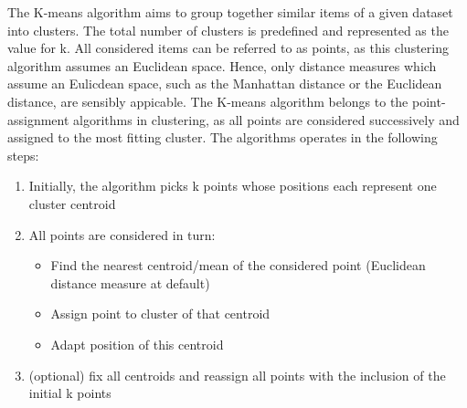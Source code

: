 The K-means algorithm aims to group together similar items of a given dataset into clusters. 
The total number of clusters is predefined and represented as the value for k. All considered items can be referred to as points, as this clustering algorithm assumes an Euclidean space. Hence, only distance measures which assume an Eulicdean space, such as the Manhattan distance or the Euclidean distance, are sensibly appicable. The K-means algorithm belongs to the point-assignment algorithms in clustering, as all points are considered successively and assigned to the most fitting cluster. The algorithms operates in the following steps: \cite{MMDS}
\begin{enumerate}
	\item Initially, the algorithm picks k points whose positions each represent one cluster centroid
	\item All points are considered in turn:
	\begin{itemize}
		\item Find the nearest centroid/mean of the considered point (Euclidean distance measure at default)
		\item Assign point to cluster of that centroid
		\item Adapt position of this centroid
	\end{itemize}	
	
	\item (optional) fix all centroids and reassign all points with the inclusion of the initial k points
	
\end{enumerate}

